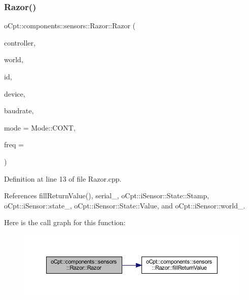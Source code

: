 \subsubsection{\texorpdfstring{Razor()}{Razor()}}
{\footnotesize\ttfamily o\+Cpt\+::components\+::sensors\+::\+Razor\+::\+Razor (\begin{DoxyParamCaption}\item[{\hyperlink{classo_cpt_1_1i_controller_a6d89a95cd6ad68bb74adfaca2f36370f}{i\+Controller\+::ptr}}]{controller,  }\item[{\hyperlink{classo_cpt_1_1_world_aa6e591e3096d5de71e0cec9039663d67}{World\+::ptr}}]{world,  }\item[{std\+::string}]{id,  }\item[{std\+::string}]{device,  }\item[{unsigned int}]{baudrate,  }\item[{\hyperlink{classo_cpt_1_1components_1_1sensors_1_1_razor_afed258e485aaaf9193a57d649ccb159b}{Mode}}]{mode = {\ttfamily Mode\+:\+:CONT},  }\item[{uint8\+\_\+t}]{freq = {} }\end{DoxyParamCaption})}



Definition at line 13 of file Razor.\+cpp.



References fill\+Return\+Value(), serial\+\_\+, o\+Cpt\+::i\+Sensor\+::\+State\+::\+Stamp, o\+Cpt\+::i\+Sensor\+::state\+\_\+, o\+Cpt\+::i\+Sensor\+::\+State\+::\+Value, and o\+Cpt\+::i\+Sensor\+::world\+\_\+.

Here is the call graph for this function\+:
\nopagebreak
\begin{figure}[H]
\begin{center}
\leavevmode
\includegraphics[width=350pt]{classo_cpt_1_1components_1_1sensors_1_1_razor_a0434b265af592450a1acef4a95765575_cgraph}
\end{center}
\end{figure}
\hypertarget{classo_cpt_1_1components_1_1sensors_1_1_razor_ae77b23479f6e7b52ed25c9989a0f1903}{}\label{classo_cpt_1_1components_1_1sensors_1_1_razor_ae77b23479f6e7b52ed25c9989a0f1903} 
